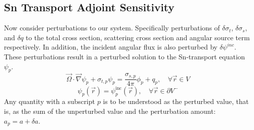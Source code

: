\documentclass{article}
\newcommand{\vr}{\vec{r}}
\newcommand{\vO}{\vec{\Omega}}
\newcommand{\grad}{\vec{\nabla}}
\newcommand{\sigt}{\sigma_t}
\newcommand{\sigs}{\sigma_s}
\begin{document}
\subsection{Sn Transport Adjoint Sensitivity}

Now consider perturbations to our system. Specifically perturbations of $\delta \sigt$, $\delta \sigs$, and $\delta q$ to the total cross section, scattering cross section and angular source term respectively. In addition, the incident angular flux is also perturbed by $\delta \psi^{inc}$. These perturbations result in a perturbed solution to the Sn-transport equation $\psi_p$. 
\begin{equation}
\label{snFwdPert}
\vO \cdot \grad \psi_p + \sigma_{t,p} \psi_p = \frac{\sigma_{s,p}}{4 \pi} \phi_p + q_p,  \quad \forall \vr \in V
\end{equation}
\begin{equation}
\psi_p(\vr) = \psi_p^{\text{inc}}(\vr), \quad \forall \vr \in \partial V^{-}
\end{equation}
Any quantity with a subscript $p$ is to be understood as the perturbed value, that is, as 
the sum of the unperturbed value and the perturbation amount: $a_p = a + \delta a$.
\end{document}
